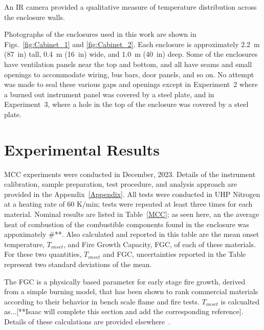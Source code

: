 \documentclass[12pt]{article}
\begin{document}
An IR camera provided a qualitative measure of temperature distribution across the enclosure walls.

Photographs of the enclosures used in this work are shown in Figs.~\ref{fig:Cabinet_1} and \ref{fig:Cabinet_2}. Each enclosure is approximately 2.2~m (87~in) tall, 0.4~m (16~in) wide, and 1.0~m (40~in) deep. Some of the enclosures have ventilation panels near the top and bottom, and all have seams and small openings to accommodate wiring, bus bars, door panels, and so on. No attempt was made to seal these various gaps and openings except in Experiment~2 where a burned out instrument panel was covered by a steel plate, and in Experiment~3, where a hole in the top of the enclosure was covered by a steel plate.



\clearpage


\section{Experimental Results}
\label{sec:results}
MCC experiments were conducted in December, 2023. Details of the instrument calibration, sample preparation, test procedure, and analysis approach are provided in the Appendix~\ref{Appendix}. All tests were conducted in UHP Nitrogen at a heating rate of 60 K/min; tests were repeated at least three times for each material. Nominal results are listed in Table~\ref{MCC}; as seen here, an the average heat of combustion of the combustible components found in the enclosure was appoximately \#**. Also calculated and reported in this table are the mean onset temperature, $T_{onset}$, and Fire Growth Capacity, FGC, of each of these materials. For these two quantities, $T_{onset}$ and FGC, uncertainties reported in the Table represent two standard deviations of the mean. 

The FGC is a physically based parameter for early stage fire growth, derived from a simple burning model, that has been shown to rank commercial materials according to their behavior in bench scale flame and fire tests. $T_{onset}$  is calcualted as...[**Isaac will complete this section and add the corresponding reference]. Details of these calculations are provided elsewhere~\cite{DOT/FAA/TC-20/30, lyon2021molecular}.
\end{document}
